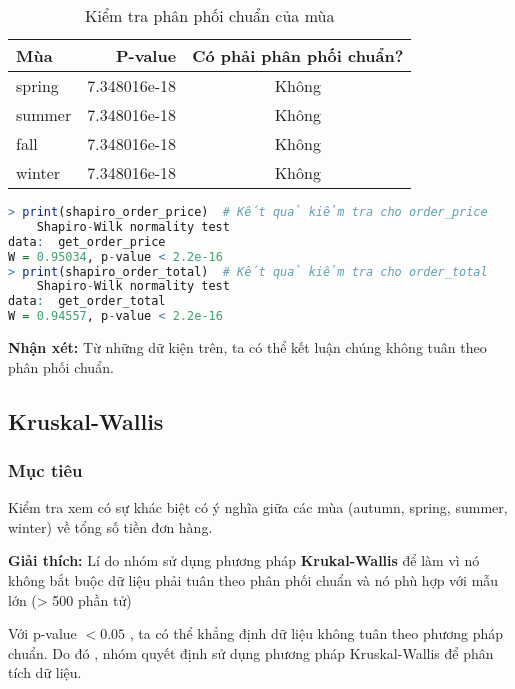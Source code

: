 \begin{table}[H]
\centering
\begin{tabular}{|l|r|c|} %
\hline
\textbf{Mùa} & \textbf{P-value}       & \textbf{Có phải phân phối chuẩn?} \\ \hline
spring          & 7.348016e-18          & Không                        \\ \hline
summer          & 7.348016e-18          & Không                        \\ \hline
fall            & 7.348016e-18          & Không                        \\ \hline
winter          & 7.348016e-18          & Không                        \\ \hline
\end{tabular}
\caption{Kiểm tra phân phối chuẩn của mùa}
\label{tab:normality_results}
\end{table}
\begin{lstlisting}[language=R,caption=Hai cột còn lại]
> print(shapiro_order_price)  # Kết quả kiểm tra cho order_price
	Shapiro-Wilk normality test
data:  get_order_price
W = 0.95034, p-value < 2.2e-16
> print(shapiro_order_total)  # Kết quả kiểm tra cho order_total
	Shapiro-Wilk normality test
data:  get_order_total
W = 0.94557, p-value < 2.2e-16

\end{lstlisting}
\begin{boxH}
    \textbf{Nhận xét:} Từ những dữ kiện trên, ta có thể kết luận chúng không tuân theo phân phối chuẩn.
\end{boxH}
\subsection{Kruskal-Wallis}
\subsubsection{Mục tiêu}
Kiểm tra xem có sự khác biệt có ý nghĩa giữa các mùa (autumn, spring, summer, winter) về tổng số tiền đơn hàng.
\begin{boxH}
\textbf{Giải thích:} Lí do nhóm sử dụng phương pháp \textbf{Krukal-Wallis} để làm vì nó không bắt buộc dữ liệu phải tuân theo phân phối chuẩn và nó phù hợp với mẫu lớn (> 500 phần tử)
\end{boxH}


Với p-value $<0.05$ , ta có thể khẳng định dữ liệu không tuân theo phương pháp chuẩn. Do đó , nhóm quyết định sử dụng phương pháp Kruskal-Wallis để phân tích dữ liệu. 

